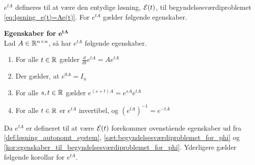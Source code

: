 
$e^{tA}$ defineres til at være den entydige løsning, $\mathcal{E}(t)$, til begyndelsesværdiproblemet \eqref{eq:løsning_e(t)=Ae(t)}. For $e^{tA}$ gælder følgende egenskaber.


\begin{thmx} \textbf{Egenskaber for} \label{sæt:egenskaber_for_eta} $\bm{e^{tA}}$\\
Lad $A\in\mathbb{R}^{n\times n}$, så har $e^{tA}$ følgende egenskaber. 
    \begin{enumerate}
        \item For alle $t\in \mathbb{R}$ gælder $\frac{d}{dt}e^{tA} = Ae^{tA}$
        \item Der gælder, at $e^{0A} = I_n$
        \item For alle $s,t\in \mathbb{R}$ gælder $e^{(s+t)A} = e^{sA} e^{tA}$
        \item For alle $t\in\mathbb{R}$ er $e^{tA}$ invertibel, og $(e^{tA})^{-1} = e^{-tA}$
    \end{enumerate}
\end{thmx}

Da $e^{tA}$ er defineret til at være $\mathcal{E}(t)$ forekommer ovenstående egenskaber ud fra \autoref{def:løsning_autonomt_system}, \autoref{sæt:begyndelsesværdiproblemet_for_phi} og \autoref{kor:egenskaber_til_begyndelsesværdiproblemet_for_phi}. Yderligere gælder følgende korollar for $e^{tA}$.


